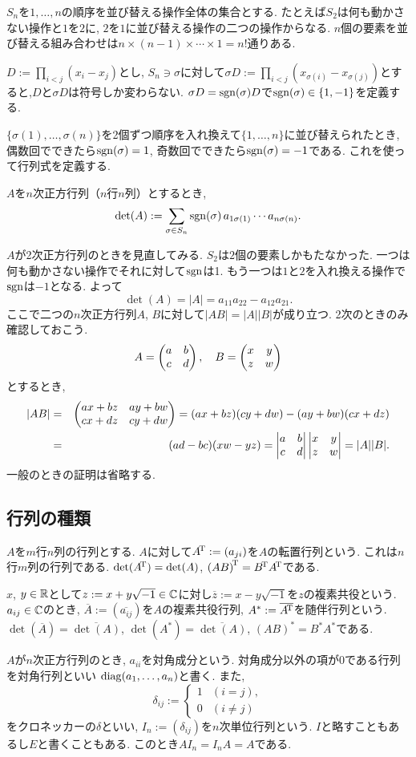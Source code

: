 $S_n$を$1,\ldots,n$の順序を並び替える操作全体の集合とする. たとえば$S_2$は何も動かさない操作と$1$を$2$に, $2$を$1$に並び替える操作の二つの操作からなる. $n$個の要素を並び替える組み合わせは$n \times (n-1) \times \cdots \times 1 = n!$通りある.

$D:=\prod_{i<j}(x_i - x_j)$とし, $S_n \ni \sigma$に対して$\sigma D := \prod_{i<j}\left(x_{\sigma(i)} - x_{\sigma(j)}\right)$とすると,$D$と$\sigma D$は符号しか変わらない. $\sigma D = \mathop{\mathrm{sgn}}\nolimits(\sigma) D$で$\mathop{\mathrm{sgn}}\nolimits(\sigma) \in \{1,-1\}$を定義する.

$\{\sigma(1), \ldots, \sigma(n)\}$を2個ずつ順序を入れ換えて$\{1, \ldots, n\}$に並び替えられたとき, 偶数回でできたら$\mathop{\mathrm{sgn}}\nolimits(\sigma)=1$, 奇数回でできたら$\mathop{\mathrm{sgn}}\nolimits(\sigma)=-1$である.
これを使って行列式を定義する.

$A$を$n$次正方行列（$n$行$n$列）とするとき,
$$\det(A):=\sum_{\sigma \in S_n} \mathop{\mathrm{sgn}}\nolimits(\sigma)\, a_{1 \sigma(1)} \cdots a_{n \sigma(n)}.$$

$A$が2次正方行列のときを見直してみる. $S_2$は$2$個の要素しかもたなかった. 一つは何も動かさない操作でそれに対して$\mathop{\mathrm{sgn}}\nolimits$は1.
もう一つは$1$と$2$を入れ換える操作で$\mathop{\mathrm{sgn}}\nolimits$は$-1$となる. よって
$$
\det(A)=|A|= a_{1 1} a_{2 2} - a_{1 2} a_{2 1}.
$$
ここで二つの$n$次正方行列$A$, $B$に対して$|AB|=|A||B|$が成り立つ. 2次のときのみ確認しておこう.
$$
  A = \begin{pmatrix} a & b \\ c & d \end{pmatrix}
  ,\quad
  B = \begin{pmatrix} x & y \\ z & w \end{pmatrix}
$$
とするとき,
\begin{eqnarray*}
|AB|
 &=& \begin{pmatrix} ax+bz & ay+bw \\ cx+dz & cy+dw \end{pmatrix}
  = (ax+bz)(cy+dw)-(ay+bw)(cx+dz) \\
 &=& (ad-bc)(xw-yz)
  = \begin{vmatrix} a & b \\ c & d \end{vmatrix} \begin{vmatrix} x & y \\ z & w \end{vmatrix}
  = |A||B|.
\end{eqnarray*}
一般のときの証明は省略する.

\subsection{行列の種類}

$A$を$m$行$n$列の行列とする. $A$に対して${A}^{\!\mathrm{T}} := (a_{ji})$を$A$の転置行列という.
これは$n$行$m$列の行列である.
$\det({A}^{\!\mathrm{T}})=\det(A)$, ${(AB)}^{\!\mathrm{T}}={B}^{\!\mathrm{T}}{A}^{\!\mathrm{T}}$である.

$x$, $y \in \mathbb{R}$として$z:=x+y\sqrt{-1} \in \mathbb{C}$に対し$\overline{z}:=x-y\sqrt{-1}$を$z$の複素共役という.
$a_{ij}\in \mathbb{C}$のとき, $\overline{A}:=(\overline{a_{ij}})$を$A$の複素共役行列,
$A^*:=\overline{{A}^{\!\mathrm{T}}}$を随伴行列という.
$\det(\overline{A})=\overline{\det(A)}$, $\det(A^*)=\overline{\det(A)}$, $(AB)^*=B^* A^*$である.

$A$が$n$次正方行列のとき, $a_{ii}$を対角成分という.
対角成分以外の項が$0$である行列を対角行列といい $\mathop{\mathrm{diag}}\nolimits(a_1, \ldots, a_n)$と書く.
また,
$$
\delta_{ij}:=
\begin{cases}
1 & (i = j), \\
0 & (i \neq j)
\end{cases}
$$
をクロネッカーの$\delta$といい,
$I_n:=(\delta_{ij})$を$n$次単位行列という. $I$と略すこともあるし$E$と書くこともある.
このとき$AI_n=I_nA=A$である.

